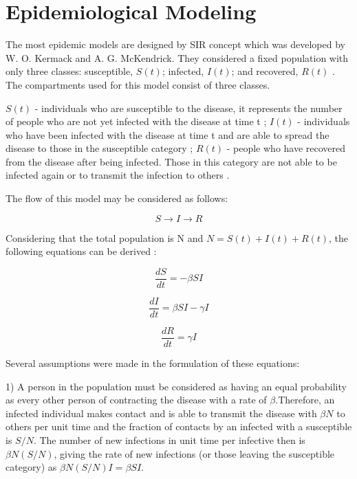 \chapter{Epidemiological Modeling}


The most epidemic models are designed by SIR concept which was developed by W. O. Kermack and A. G. McKendrick. They considered a fixed population with only three classes: susceptible, $S(t)$; infected, $I(t)$; and recovered, $R(t)$ \cite{per14}. The compartments used for this model consist of three classes.

$S(t)$ - individuals who are susceptible to the disease, it represents the number of people who are not yet infected with the disease at time t \cite{per14};
$I(t)$ - individuals who have been infected with the disease at time t and are able to spread the disease to those in the susceptible category \cite{per14};
$R(t)$ - people who have recovered from the disease after being infected. Those in this category are not able to be infected again or to transmit the infection to others \cite{per14}.

The flow of this model may be considered as follows:

\begin{equation}
S \rightarrow I \rightarrow R
\end{equation}

Considering that the total population is N and $N = S(t) + I(t) + R(t)$, the following equations can be derived \cite{per15}:

\begin{equation}
\frac{dS}{dt} = -\beta S I
\end{equation}

\begin{equation}
\frac{dI}{dt} = \beta S I - \gamma I
\end{equation}

\begin{equation}
\frac{dR}{dt} = \gamma I
\end{equation}

Several assumptions were made in the formulation of these equations:

1) A person in the population must be considered as having an equal probability as every other person of contracting the disease with a rate of  $\beta$.Therefore, an infected individual makes contact and is able to transmit the disease with $\beta N$ to others per unit time and the fraction of contacts by an infected with a susceptible is $S/N$. The number of new infections in unit time per infective then is $\beta N (S/N)$, giving the rate of new infections (or those leaving the susceptible category) as $\beta N (S/N) I = \beta S I$. \cite{per14}

